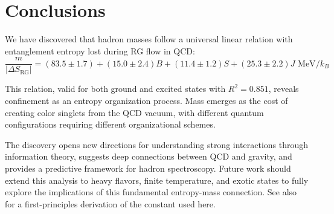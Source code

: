 \documentclass[12pt,a4paper]{article}
\begin{document}
\section{Conclusions}

We have discovered that hadron masses follow a universal linear relation with entanglement entropy lost during RG flow in QCD:
\begin{equation}
\boxed{\frac{m}{|\Delta S_{\text{RG}}|} = (83.5 \pm 1.7) + (15.0 \pm 2.4)B + (11.4 \pm 1.2)S + (25.3 \pm 2.2)J \text{ MeV}/k_B}
\end{equation}

This relation, valid for both ground and excited states with $R^2 = 0.851$, reveals confinement as an entropy organization process. Mass emerges as the cost of creating color singlets from the QCD vacuum, with different quantum configurations requiring different organizational schemes.

The discovery opens new directions for understanding strong interactions through information theory, suggests deep connections between QCD and gravity, and provides a predictive framework for hadron spectroscopy. Future work should extend this analysis to heavy flavors, finite temperature, and exotic states to fully explore the implications of this fundamental entropy-mass connection. See also \cite{TupayP5} for a first-principles derivation of the constant used here.
\end{document}
